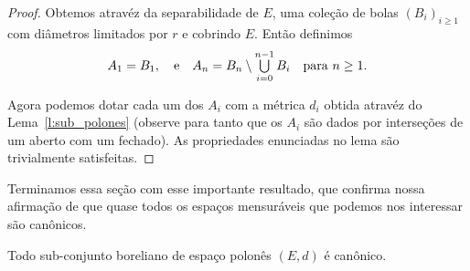 \begin{proof}
  Obtemos atravéz da separabilidade de $E$, uma coleção de bolas $(B_i)_{i \geq 1}$ com diâmetros limitados por $r$ e cobrindo $E$.
  Então definimos
  \begin{equation}
    A_1 = B_1, \quad \text{e} \quad A_n = B_n \setminus \operatorname*{{\textstyle \bigcup}}_{i=0}^{n-1} B_i \quad \text{para $n \geq 1$.}
  \end{equation}

  Agora podemos dotar cada um dos $A_i$ com a métrica $d_i$ obtida atravéz do Lema~\ref{l:sub_polones} (observe para tanto que os $A_i$ são dados por interseções de um aberto com um fechado).
  As propriedades enunciadas no lema são trivialmente satisfeitas.
\end{proof}

Terminamos essa seção com esse importante resultado, que confirma nossa afirmação de que quase todos os espaços mensuráveis que podemos nos interessar são canônicos.

\begin{theorem}
  Todo sub-conjunto boreliano de espaço polonês $(E, d)$ é canônico.
\end{theorem}

